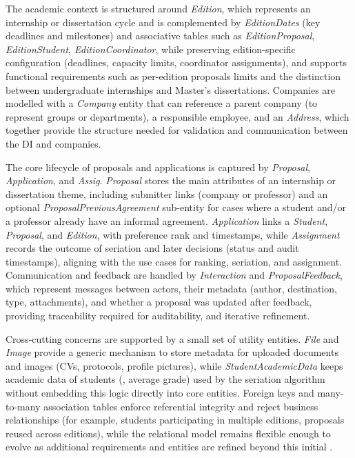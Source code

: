     {
        The academic context is structured around \textit{Edition}, which represents an internship or dissertation cycle and is complemented by
        \textit{EditionDates} (key deadlines and milestones) and associative tables such as \textit{EditionProposal}, \textit{EditionStudent}, \textit{EditionCoordinator},
        while preserving edition-specific configuration (deadlines, capacity limits, coordinator assignments), and supports
        functional requirements such as per-edition proposals limits and the distinction between undergraduate internships and Master's
        dissertations.
        Companies are modelled with a \textit{Company} entity that can reference a parent company (to represent groups or departments), a responsible
        employee, and an \textit{Address}, which together provide the structure needed for validation and communication between the \gls{DI} and companies.
    }

    {
        The core lifecycle of proposals and applications is captured by \textit{Proposal}, \textit{Application}, and \textit{Assig}.
        \textit{Proposal} stores the main attributes of an internship or dissertation theme, including submitter links (company or professor)
        and an optional \textit{ProposalPreviousAgreement} sub-entity for cases where a student and/or a professor already have an informal agreement.
        \textit{Application} links a \textit{Student}, \textit{Proposal}, and \textit{Edition}, with preference rank and timestamps, while \textit{Assignment} records the outcome of 
        seriation and later decisions (status and audit timestamps), aligning with the use cases for ranking, seriation, and assignment.
        Communication and feedback are handled by \textit{Interaction} and \textit{ProposalFeedback}, which represent messages between actors, their metadata
        (author, destination, type, attachments), and whether a proposal was updated after feedback, providing traceability required for auditability,
        and iterative refinement.
    }

    {
        Cross-cutting concerns are supported by a small set of utility entities. \textit{File} and \textit{Image} provide a generic mechanism to store metadata
        for uploaded documents and images (CVs, protocols, profile pictures), while \textit{StudentAcademicData} keeps academic data of students (, average grade)
        used by the seriation algorithm without embedding this logic directly into core entities.
        Foreign keys and many-to-many association tables enforce referential integrity and reject business relationships (for example,
        students participating in multiple editions, proposals reused across editions), while the relational model remains flexible enough to evolve 
        as additional requirements and entities are refined beyond this initial .
        
    }

